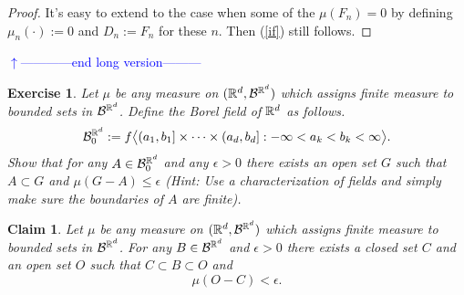 \documentclass[10pt,letterpaper,twocolumn]{article}
\newtheorem{claim}{Claim}
\newtheorem{exercise}{Exercise}
\begin{document}
{\begin{proof}
It's easy to extend to the case when some of the $\mu(F_n)=0$ by defining $\mu_n (\cdot):=0$ and $D_n:=F_n$ for these $n$. Then (\ref{if}) still follows.
\end{proof}

%
{\flushleft\textcolor{blue}{$\uparrow$------------end long version---------}}\newline
} \fi




\begin{exercise}
\label{l2}
Let $\mu$ be any measure on $(\Bbb R^d,\mathcal B^{\Bbb R^d})$ which assigns finite measure to bounded sets in $\mathcal B^{\Bbb R^d}$.
Define the Borel field of $\Bbb R^d$ as follows.
\begin{align*}
\mathcal B_0^{\Bbb R^d}:= f\bigl\langle (a_1,b_1]\times \cdots \times (a_d,b_d]: -\infty< a_k < b_k<\infty \bigr\rangle.
 \end{align*}
Show that for any  $A\in \mathcal B_0^{\Bbb R^d}$ and any $\epsilon>0$ there exists an open set $G$ such that $A\subset G$ and $\mu(G-A)\leq \epsilon$
(Hint:  Use a characterization of fields and simply make sure the boundaries of $A$ are finite).
\end{exercise}





\begin{claim}
\label{oir}
Let $\mu$ be any measure on $(\Bbb R^d,\mathcal B^{\Bbb R^d})$ which assigns finite measure to bounded sets in $\mathcal B^{\Bbb R^d}$.
For any  $B\in\mathcal B^{\Bbb R^d}$ and $\epsilon>0$ there exists a closed set $C$ and an open set $O$ such that $C\subset B\subset O$ and
\[\mathcal \mu(O-C)<\epsilon.\]
\end{claim}
\end{document}
